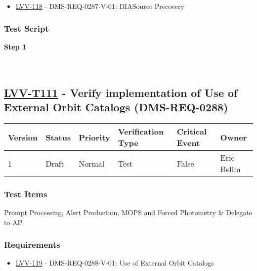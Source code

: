 \begin{itemize}
\tightlist
\item
  \href{https://jira.lsstcorp.org/browse/LVV-118}{LVV-118} -
  DMS-REQ-0287-V-01: DIASource Precovery
\end{itemize}

\hypertarget{test-script-10}{%
\subsubsection{Test Script}\label{test-script-10}}

\textbf{Step 1}\\
~\\
~\\

\hypertarget{lvv-t111---verify-implementation-of-use-of-external-orbit-catalogs-dms-req-0288}{%
\subsection{\texorpdfstring{\href{https://jira.lsstcorp.org/secure/Tests.jspa\#/testCase/LVV-T111}{LVV-T111}
- Verify implementation of Use of External Orbit Catalogs
(DMS-REQ-0288)}{LVV-T111 - Verify implementation of Use of External Orbit Catalogs (DMS-REQ-0288)}}\label{lvv-t111---verify-implementation-of-use-of-external-orbit-catalogs-dms-req-0288}}

\begin{longtable}[]{@{}llllll@{}}
\toprule
Version & Status & Priority & Verification Type & Critical Event &
Owner\tabularnewline
\midrule
\endhead
1 & Draft & Normal & Test & False & Eric Bellm\tabularnewline
\bottomrule
\end{longtable}

\hypertarget{test-items-11}{%
\subsubsection{Test Items}\label{test-items-11}}

Prompt Processing, Alert Production, MOPS and Forced Photometry \&
Delegate to AP

\hypertarget{requirements-11}{%
\subsubsection{Requirements}\label{requirements-11}}

\begin{itemize}
\tightlist
\item
  \href{https://jira.lsstcorp.org/browse/LVV-119}{LVV-119} -
  DMS-REQ-0288-V-01: Use of External Orbit Catalogs
\end{itemize}

